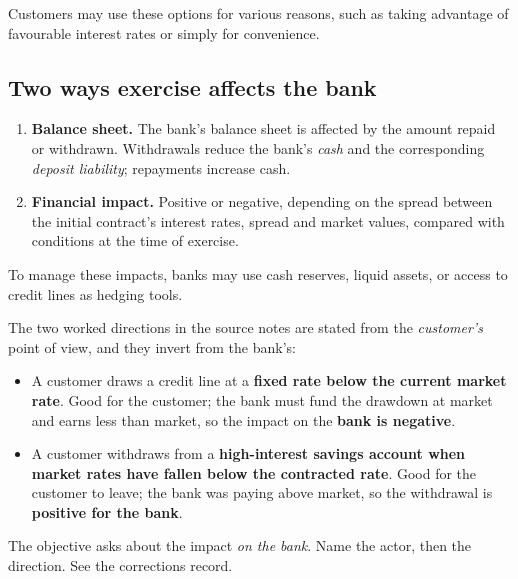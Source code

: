 Customers may use these options for various reasons, such as taking advantage of favourable interest rates or simply for convenience.

\subsection{Two ways exercise affects the bank}

\begin{enumerate}
\item \textbf{Balance sheet.} The bank's balance sheet is affected by the amount repaid or withdrawn. Withdrawals reduce the bank's \emph{cash} and the corresponding \emph{deposit liability}; repayments increase cash.
\item \textbf{Financial impact.} Positive or negative, depending on the spread between the initial contract's interest rates, spread and market values, compared with conditions at the time of exercise.
\end{enumerate}

To manage these impacts, banks may use cash reserves, liquid assets, or access to credit lines as hedging tools.

\begin{lrtrapbox}
The two worked directions in the source notes are stated from the \emph{customer's} point of view, and they invert from the bank's:
\begin{itemize}
\item A customer draws a credit line at a \textbf{fixed rate below the current market rate}. Good for the customer; the bank must fund the drawdown at market and earns less than market, so the impact on the \textbf{bank is negative}.
\item A customer withdraws from a \textbf{high-interest savings account when market rates have fallen below the contracted rate}. Good for the customer to leave; the bank was paying above market, so the withdrawal is \textbf{positive for the bank}.
\end{itemize}
The objective asks about the impact \emph{on the bank}. Name the actor, then the direction. See the corrections record.
\end{lrtrapbox}


